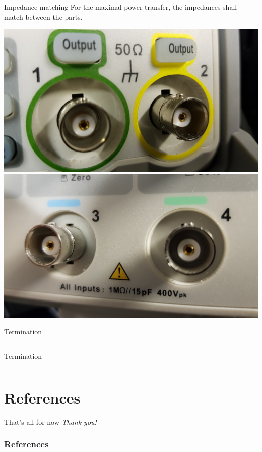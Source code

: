 \documentclass{beamer}
\begin{document}
\begin{frame}{Impedance matching}
For the maximal power transfer, the impedances shall match between the parts.

\includegraphics[width=0.4\linewidth]{coaxial_out.jpg}
\includegraphics[width=0.4\linewidth]{coaxial_in.jpg}
\end{frame}

\begin{frame}{Termination}
\begin{columns}
  \begin{column}{0.48\textwidth}
    Termination
  \end{column}
  \begin{column}{0.48\textwidth}
  \end{column}
\end{columns}
\end{frame}

\logo{} %
\section{References}

\begin{frame}{That's all for now}
\centering \Huge
\emph{Thank you!}
\end{frame}

\begin{frame}[t, allowframebreaks]
\frametitle{References}


\end{frame}
\end{document}

